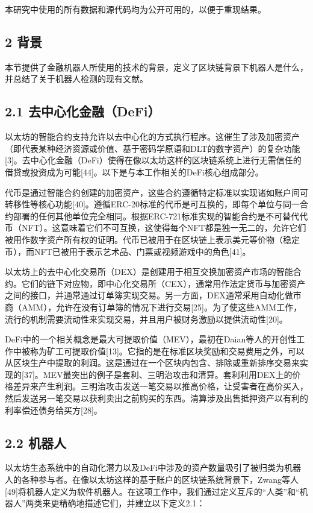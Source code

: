 本研究中使用的所有数据和源代码均为公开可用的，以便于重现结果。

\subsection*{2 背景}

本节提供了金融机器人所使用的技术的背景，定义了区块链背景下机器人是什么，并总结了关于机器人检测的现有文献。

\subsection*{2.1 去中心化金融（DeFi）}

以太坊的智能合约支持允许以去中心化的方式执行程序。这催生了涉及加密资产（即代表某种经济资源或价值、基于密码学原语和DLT的数字资产）的复杂功能[3]。去中心化金融（DeFi）使得在像以太坊这样的区块链系统上进行无需信任的借贷或投资成为可能[44]。以下是与本工作相关的DeFi核心组成部分。

代币是通过智能合约创建的加密资产，这些合约遵循特定标准以实现诸如账户间可转移性等核心功能[40]。遵循ERC-20标准的代币是可互换的，即每个单位与同一合约部署的任何其他单位完全相同。根据ERC-721标准实现的智能合约是不可替代代币（NFT）。这意味着它们不可互换，这使得每个NFT都是独一无二的，允许它们被用作数字资产所有权的证明。代币已被用于在区块链上表示美元等价物（稳定币），而NFT已被用于表示艺术品、门票或视频游戏中的角色[41]。

以太坊上的去中心化交易所（DEX）是创建用于相互交换加密资产市场的智能合约。它们的链下对应物，即中心化交易所（CEX），通常用作法定货币与加密资产之间的接口，并通常通过订单簿实现交易。另一方面，DEX通常采用自动化做市商（AMM），允许在没有订单簿的情况下进行交易[25]。为了使这些AMM工作，流行的机制需要流动性来实现交易，并且用户被财务激励以提供流动性[20]。

DeFi中的一个相关概念是最大可提取价值（MEV），最初在Daian等人的开创性工作中被称为矿工可提取价值[13]。它指的是在标准区块奖励和交易费用之外，可以从区块生产中提取的利润。这是通过在一个区块内包含、排除或重新排序交易来实现的[37]。MEV最突出的例子是套利、三明治攻击和清算。套利利用DEX上的价格差异来产生利润。三明治攻击发送一笔交易以推高价格，让受害者在高价买入，然后发送另一笔交易以获利卖出之前购买的东西。清算涉及出售抵押资产以有利的利率偿还债务给买方[28]。

\subsection*{2.2 机器人}

以太坊生态系统中的自动化潜力以及DeFi中涉及的资产数量吸引了被归类为机器人的各种参与者。在像以太坊这样的基于账户的区块链系统背景下，Zwang等人[49]将机器人定义为软件机器人。在这项工作中，我们通过定义互斥的“人类”和“机器人”两类来更精确地描述它们，并建立以下定义2.1：

